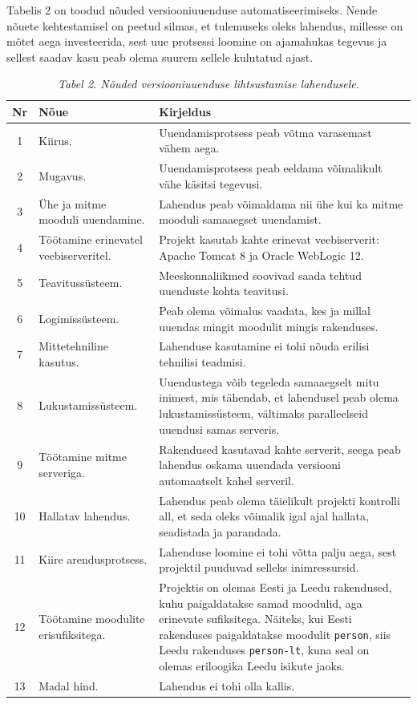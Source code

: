 \documentclass[12pt]{article}
\newcommand{\code}[1]{\texttt{#1}}
\begin{document}
  Tabelis 2 on toodud nõuded versiooniuuenduse automatiseerimiseks. Nende nõuete kehtestamisel on peetud silmas, et tulemuseks oleks lahendus, millesse on mõtet aega investeerida, sest uue protsessi loomine on ajamahukas tegevus ja sellest saadav kasu peab olema suurem sellele kulutatud ajast.
  
  \begin{table}[H]
    \caption*{\textit{Tabel 2. Nõuded versiooniuuenduse lihtsustamise lahendusele.}}
    
    \begin{tabular}{|c|p{3.5cm}|p{9cm}|}
      \hline
      \textbf{Nr} & \textbf{Nõue} & \textbf{Kirjeldus}\\
      \hline
      1 & Kiirus. & Uuendamisprotsess peab võtma varasemast vähem aega.\\
      \hline
      2 & Mugavus. & Uuendamisprotsess peab eeldama võimalikult vähe käsitsi tegevusi.\\
      \hline
      3 & Ühe ja mitme mooduli uuendamine. & Lahendus peab võimaldama nii ühe kui ka mitme mooduli samaaegset uuendamist.\\
      \hline
      4 & Töötamine erinevatel veebiserveritel. & Projekt kasutab kahte erinevat veebiserverit: Apache Tomcat 8 ja Oracle WebLogic 12.\\
      \hline
      5 & Teavitussüsteem. & Meeskonnaliikmed soovivad saada tehtud uuenduste kohta teavitusi.\\
      \hline
      6 & Logimissüsteem. & Peab olema võimalus vaadata, kes ja millal uuendas mingit moodulit mingis rakenduses.\\
      \hline
      7 & Mittetehniline kasutus. & Lahenduse kasutamine ei tohi nõuda erilisi tehnilisi teadmisi.\\
      \hline
      8 & Lukustamissüsteem. & Uuendustega võib tegeleda samaaegselt mitu inimest, mis tähendab, et lahendusel peab olema lukustamissüsteem, vältimaks paralleelseid uuendusi samas serveris.\\
      \hline
      9 & Töötamine mitme serveriga. & Rakendused kasutavad kahte serverit, seega peab lahendus oskama uuendada versiooni automaatselt kahel serveril.\\
      \hline
      10 & Hallatav lahendus. & Lahendus peab olema täielikult projekti kontrolli all, et seda oleks võimalik igal ajal hallata, seadistada ja parandada.\\
      \hline
      11 & Kiire arendusprotsess. & Lahenduse loomine ei tohi võtta palju aega, sest projektil puuduvad selleks inimressursid.\\
      \hline
      12 & Töötamine moodulite erisufiksitega. & Projektis on olemas Eesti ja Leedu rakendused, kuhu paigaldatakse samad moodulid, aga erinevate sufiksitega. Näiteks, kui Eesti rakenduses paigaldatakse moodulit \code{person}, siis Leedu rakenduses \code{person-lt}, kuna seal on olemas eriloogika Leedu isikute jaoks.\\
      \hline
      13 & Madal hind. & Lahendus ei tohi olla kallis.\\
      \hline
    \end{tabular}
  \end{table}
  
\end{document}

